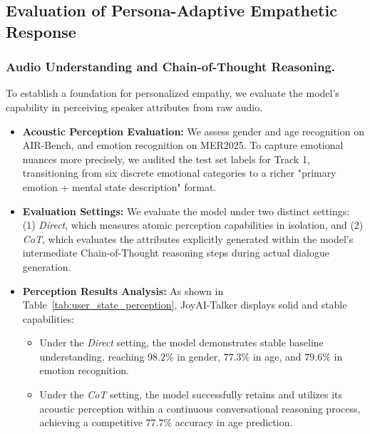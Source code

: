 \vspace{3pt}
\subsection{Evaluation of Persona-Adaptive Empathetic Response}
\label{sec:empathy_eval}

\subsubsection{Audio Understanding and Chain-of-Thought Reasoning.}


To establish a foundation for personalized empathy, we evaluate the model's capability in perceiving speaker attributes from raw audio. 

\begin{itemize}
    \item \textbf{Acoustic Perception Evaluation:} We assess gender and age recognition on AIR-Bench, and emotion recognition on MER2025. To capture emotional nuances more precisely, we audited the test set labels for Track 1, transitioning from six discrete emotional categories to a richer "primary emotion + mental state description" format.
    
    \item \textbf{Evaluation Settings:} We evaluate the model under two distinct settings: (1) \textit{Direct}, which measures atomic perception capabilities in isolation, and (2) \textit{CoT}, which evaluates the attributes explicitly generated within the model's intermediate Chain-of-Thought reasoning steps during actual dialogue generation.
    
    \item \textbf{Perception Results Analysis:} As shown in Table~\ref{tab:user_state_perception}, JoyAI-Talker displays solid and stable capabilities:
    \begin{itemize}
        \item Under the \textit{Direct} setting, the model demonstrates stable baseline understanding, reaching $98.2\%$ in gender, $77.3\%$ in age, and $79.6\%$ in emotion recognition.
        \item Under the \textit{CoT} setting, the model successfully retains and utilizes its acoustic perception within a continuous conversational reasoning process, achieving a competitive $77.7\%$ accuracy in age prediction.
    \end{itemize}
\end{itemize}


